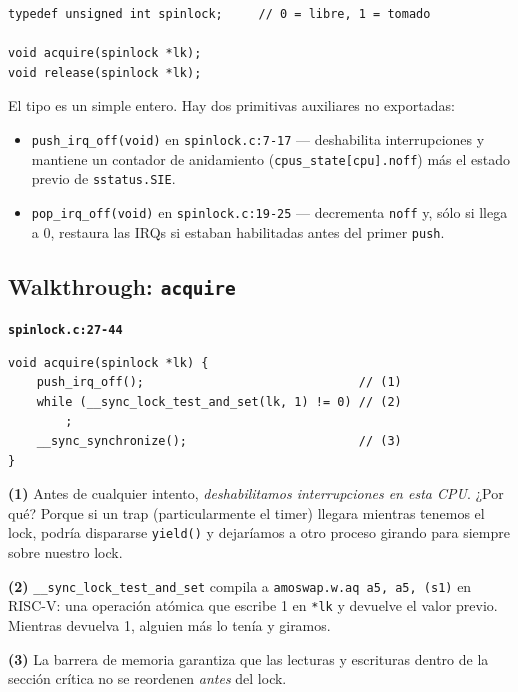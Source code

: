 \documentclass[11pt,a4paper]{article}
\begin{document}
\begin{lstlisting}[style=cstyle]
typedef unsigned int spinlock;     // 0 = libre, 1 = tomado

void acquire(spinlock *lk);
void release(spinlock *lk);
\end{lstlisting}

El tipo es un simple entero. Hay dos primitivas auxiliares no
exportadas:

\begin{itemize}[leftmargin=*,nosep]
    \item \texttt{push\_irq\_off(void)} en \texttt{spinlock.c:7-17}
        — deshabilita interrupciones y mantiene un contador de
        anidamiento (\texttt{cpus\_state[cpu].noff}) más el estado
        previo de \texttt{sstatus.SIE}.
    \item \texttt{pop\_irq\_off(void)} en \texttt{spinlock.c:19-25}
        — decrementa \texttt{noff} y, sólo si llega a 0, restaura
        las IRQs si estaban habilitadas antes del primer
        \texttt{push}.
\end{itemize}

\subsection*{Walkthrough: \texttt{acquire}}

\begin{walkthrough}
\textbf{\texttt{spinlock.c:27-44}}

\begin{lstlisting}[style=cstyle]
void acquire(spinlock *lk) {
    push_irq_off();                              // (1)
    while (__sync_lock_test_and_set(lk, 1) != 0) // (2)
        ;
    __sync_synchronize();                        // (3)
}
\end{lstlisting}

\textbf{(1)} Antes de cualquier intento, \emph{deshabilitamos
interrupciones en esta CPU}. ¿Por qué? Porque si un trap
(particularmente el timer) llegara mientras tenemos el lock, podría
dispararse \texttt{yield()} y dejaríamos a otro proceso girando
para siempre sobre nuestro lock.

\textbf{(2)} \texttt{\_\_sync\_lock\_test\_and\_set} compila a
\texttt{amoswap.w.aq a5, a5, (s1)} en RISC-V: una operación
atómica que escribe 1 en \texttt{*lk} y devuelve el valor previo.
Mientras devuelva 1, alguien más lo tenía y giramos.

\textbf{(3)} La barrera de memoria garantiza que las lecturas y
escrituras dentro de la sección crítica no se reordenen
\emph{antes} del lock.
\end{walkthrough}
\end{document}
